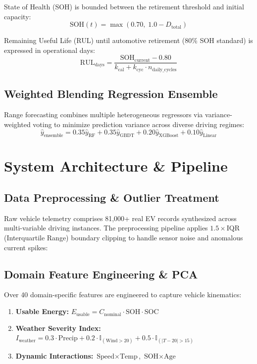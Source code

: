 \documentclass[journal]{IEEEtran}
\begin{document}
State of Health (SOH) is bounded between the retirement threshold and initial capacity:
\begin{equation}
\text{SOH}(t) = \max\left(0.70, \; 1.0 - D_{\text{total}}\right)
\end{equation}

Remaining Useful Life (RUL) until automotive retirement (80\% SOH standard) is expressed in operational days:
\begin{equation}
\text{RUL}_{\text{days}} = \frac{\text{SOH}_{\text{current}} - 0.80}{k_{\text{cal}} + k_{\text{cyc}} \cdot n_{\text{daily\_cycles}}}
\end{equation}

\subsection{Weighted Blending Regression Ensemble}
Range forecasting combines multiple heterogeneous regressors via variance-weighted voting to minimize prediction variance across diverse driving regimes:
\begin{equation}
\hat{y}_{\text{ensemble}} = 0.35 \hat{y}_{\text{RF}} + 0.35 \hat{y}_{\text{GBDT}} + 0.20 \hat{y}_{\text{XGBoost}} + 0.10 \hat{y}_{\text{Linear}}
\end{equation}

\section{System Architecture \& Pipeline}

\subsection{Data Preprocessing \& Outlier Treatment}
Raw vehicle telemetry comprises 81,000+ real EV records synthesized across multi-variable driving instances. The preprocessing pipeline applies $1.5 \times \text{IQR}$ (Interquartile Range) boundary clipping to handle sensor noise and anomalous current spikes:
\begin{equation}
[Q_1 - 1.5 \cdot \text{IQR}, \quad Q_3 + 1.5 \cdot \text{IQR}]
\end{equation}

\subsection{Domain Feature Engineering \& PCA}
Over 40 domain-specific features are engineered to capture vehicle kinematics:
\begin{enumerate}
    \item \textbf{Usable Energy:} $E_{\text{usable}} = C_{\text{nominal}} \cdot \text{SOH} \cdot \text{SOC}$
    \item \textbf{Weather Severity Index:} $I_{\text{weather}} = 0.3 \cdot \text{Precip} + 0.2 \cdot \mathbb{I}_{(\text{Wind} > 20)} + 0.5 \cdot \mathbb{I}_{(|T - 20| > 15)}$
    \item \textbf{Dynamic Interactions:} $\text{Speed} \times \text{Temp}$, $\text{SOH} \times \text{Age}$
\end{enumerate}
\end{document}
